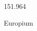 \documentclass[12pt]{article}
\begin{document}
\hfill{}
\vfill
\begin{center}
  {\fontsize{50}{60}
  }

  151.964

Europium
\end{center}
\vfill
\end{document}

